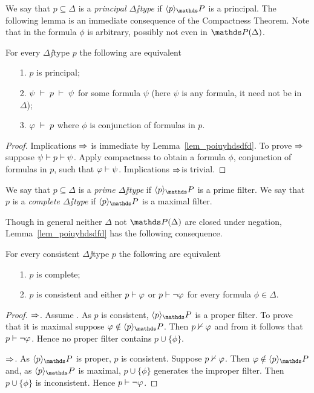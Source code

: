 \documentclass[creche.tex]{subfiles}
\begin{document}
We say that $p\subseteq\Delta$ is a \emph{principal $\Delta\jj$type\/} if $\<p\>_\PP$ is a principal. The following lemma is an immediate consequence of the Compactness Theorem. Note that in  the formula $\phi$ is arbitrary, possibly not even in $\PP(\Delta)$.

\begin{lemma}
For every $\Delta\jj$type $p$ the following are equivalent
\begin{itemize}
\item[1.] $p$ is principal;
\item[2.] $\psi \;\vdash\; p \;\vdash\; \psi$ for some formula $\psi$ (here $\psi$ is any formula, it need not be in $\Delta$);
\item[3.] $\varphi \;\vdash\; p$ where $\phi$ is conjunction of formulas in $p$.\QED
\end{itemize}
\end{lemma}

\begin{proof}
Implications $\Rightarrow$ is immediate by Lemma~\ref{lem_poiuyhdsdfd}. To prove $\Rightarrow$ suppose $\psi\vdash p\vdash\psi$. Apply compactness to obtain a formula $\phi$, conjunction of formulas in $p$, such that $\varphi\vdash\psi$. Implications $\Rightarrow$is trivial.
\end{proof}

\begin{definition}
We say that $p\subseteq\Delta$ is a \emph{prime $\Delta\jj$type\/} if $\<p\>_\PP$ is a  prime filter. We say that $p$ is a \emph{complete $\Delta\jj$type\/} if $\<p\>_\PP$ is a maximal filter.\QED
\end{definition}

Though in general neither $\Delta$ not $\PP(\Delta)$ are closed under negation, Lemma~\ref{lem_poiuyhdsdfd} has the following consequence.

\begin{proposition}\label{prop_test_completezza}
For every consistent $\Delta\jj$type $p$ the following are equivalent
\begin{itemize}
\item[1.] $p$ is complete;
\item[2.] $p$ is consistent and either $p\vdash\varphi$ or $p\vdash\neg\varphi$ for every formula $\phi\in\Delta$.
\end{itemize}
\end{proposition}
\begin{proof}
$\Rightarrow$. Assume . As $p$ is consistent, $\<p\>_\PP$ is a proper filter. To prove that it is maximal suppose $\phi\notin\<p\>_\PP$. Then $p\nvdash\varphi$ and from  it follows that  $p\vdash\neg\varphi$. Hence no proper filter contains $p\cup\{\phi\}$.

$\Rightarrow$. As $\<p\>_\PP$ is proper, $p$ is consistent. Suppose $p\nvdash\varphi$. Then $\phi\notin\<p\>_\PP$ and, as $\<p\>_\PP$ is maximal, $p\cup\{\phi\}$ generates the improper filter. Then $p\cup\{\phi\}$ is inconsistent. Hence $p\vdash\neg\varphi$.
\end{proof}
\end{document}

